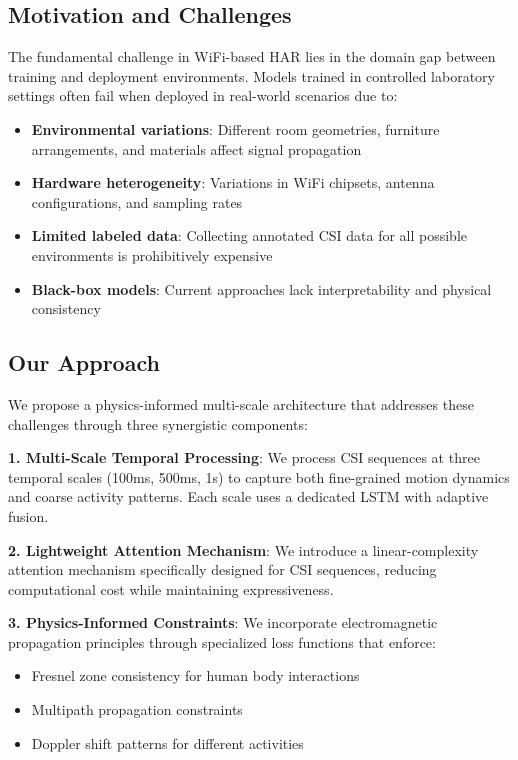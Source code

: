 \documentclass[10pt,conference]{IEEEtran}
\begin{document}
\subsection{Motivation and Challenges}

The fundamental challenge in WiFi-based HAR lies in the domain gap between training and deployment environments. Models trained in controlled laboratory settings often fail when deployed in real-world scenarios due to:
\begin{itemize}
    \item \textbf{Environmental variations}: Different room geometries, furniture arrangements, and materials affect signal propagation
    \item \textbf{Hardware heterogeneity}: Variations in WiFi chipsets, antenna configurations, and sampling rates
    \item \textbf{Limited labeled data}: Collecting annotated CSI data for all possible environments is prohibitively expensive
    \item \textbf{Black-box models}: Current approaches lack interpretability and physical consistency
\end{itemize}

\subsection{Our Approach}

We propose a physics-informed multi-scale architecture that addresses these challenges through three synergistic components:

\textbf{1. Multi-Scale Temporal Processing}: We process CSI sequences at three temporal scales (100ms, 500ms, 1s) to capture both fine-grained motion dynamics and coarse activity patterns. Each scale uses a dedicated LSTM with adaptive fusion.

\textbf{2. Lightweight Attention Mechanism}: We introduce a linear-complexity attention mechanism specifically designed for CSI sequences, reducing computational cost while maintaining expressiveness.

\textbf{3. Physics-Informed Constraints}: We incorporate electromagnetic propagation principles through specialized loss functions that enforce:
\begin{itemize}
    \item Fresnel zone consistency for human body interactions
    \item Multipath propagation constraints
    \item Doppler shift patterns for different activities
\end{itemize}
\end{document}
